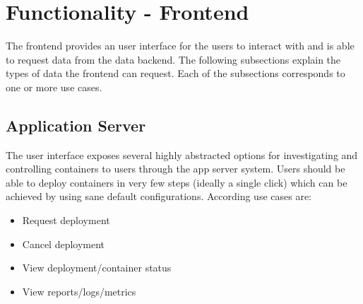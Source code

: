 \documentclass[a4paper,12pt,chapterprefix=false,bibliography=totoc,listof=totoc,]{scrreprt}
\begin{document}
\section{Functionality - Frontend}


The frontend provides an user interface for the users to interact with and is able to request data from the data backend. The following subsections explain the types of data the frontend can request. Each of the subsections corresponds to one or more use cases.




\subsection{Application Server}
The user interface exposes several highly abstracted options for investigating and controlling containers to users through the app server system. Users should be able to deploy containers in very few steps (ideally a single click) which can be achieved by using sane default configurations. According use cases are:

\begin{itemize}
    \item Request deployment
    \item Cancel deployment
    \item View deployment/container status
    \item View reports/logs/metrics
\end{itemize}
\end{document}
